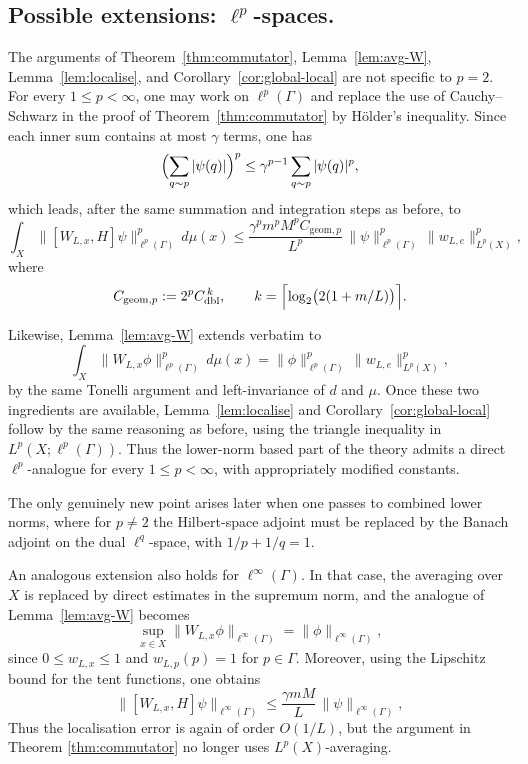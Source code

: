 \documentclass[11pt]{article}
\theoremstyle{definition}
\begin{document}
\subsection{Possible extensions: \texorpdfstring{$\ell^p$}{lp}-spaces.}
The arguments of Theorem~\ref{thm:commutator}, Lemma~\ref{lem:avg-W},
Lemma~\ref{lem:localise}, and Corollary~\ref{cor:global-local} are not specific to
$p=2$. For every $1 \leq p<\infty$, one may work on $\ell^p(\Gamma)$ and replace the
use of Cauchy--Schwarz in the proof of Theorem~\ref{thm:commutator} by H\"older's
inequality. Since each inner sum contains at most $\gamma$ terms, one has
\[
  \Bigl(\sum_{q\sim p} |\psi(q)|\Bigr)^p
  \le
  \gamma^{p-1}\sum_{q\sim p} |\psi(q)|^p,
\]
which leads, after the same summation and integration steps as before, to
\[
  \int_X \|[W_{L,x},H]\psi\|_{\ell^p(\Gamma)}^p\,d\mu(x)
  \le
  \frac{\gamma^p m^p M^p C_{\mathrm{geom},p}}{L^p}\,
  \|\psi\|_{\ell^p(\Gamma)}^p\,\|w_{L,e}\|_{L^p(X)}^p,
\]
where
\[
  C_{\mathrm{geom},p}:=2^p C_{\mathrm{dbl}}^{\,k},
  \qquad
  k=\Bigl\lceil\log_2\bigl(2(1+m/L)\bigr)\Bigr\rceil.
\]

Likewise, Lemma~\ref{lem:avg-W} extends verbatim to
\[
  \int_X \|W_{L,x}\phi\|_{\ell^p(\Gamma)}^p\,d\mu(x)
  =
  \|\phi\|_{\ell^p(\Gamma)}^p\,\|w_{L,e}\|_{L^p(X)}^p,
\]
by the same Tonelli argument and left-invariance of $d$ and $\mu$. Once these two
ingredients are available, Lemma~\ref{lem:localise} and
Corollary~\ref{cor:global-local} follow by the same reasoning as before, using the
triangle inequality in $L^p(X;\ell^p(\Gamma))$. Thus the lower-norm based part of the theory admits a direct \(\ell^p\)-analogue for every \(1 \leq p<\infty\), with appropriately modified constants.

The only genuinely new point arises later when one passes to combined lower norms,
where for $p\neq2$ the Hilbert-space adjoint must be replaced by the Banach adjoint on
the dual \(\ell^q\)-space, with \(1/p+1/q=1\).

An analogous extension also holds for $\ell^\infty(\Gamma)$. In that case, the averaging over
$X$ is replaced by direct estimates in the supremum norm, and the analogue of
Lemma~\ref{lem:avg-W} becomes
\[
  \sup_{x\in X}\|W_{L,x}\phi\|_{\ell^\infty(\Gamma)}
  = \|\phi\|_{\ell^\infty(\Gamma)},
\]
since $0\le w_{L,x}\le 1$ and $w_{L,p}(p)=1$ for $p\in\Gamma$. Moreover, using the Lipschitz
bound for the tent functions, one obtains
\[
  \|[W_{L,x},H]\psi\|_{\ell^\infty(\Gamma)}
  \le
  \frac{\gamma mM}{L}\,\|\psi\|_{\ell^\infty(\Gamma)},
\]
Thus the localisation error is again of order $O(1/L)$, but the argument in Theorem \ref{thm:commutator} no longer uses
$L^p(X)$-averaging. 






\end{document}
